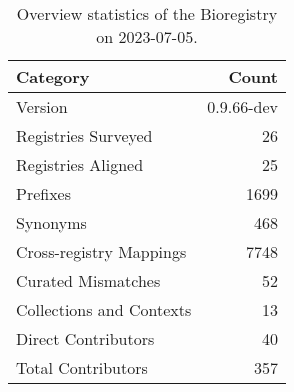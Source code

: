 \begin{table}
\caption{Overview statistics of the Bioregistry on 2023-07-05.}
\label{tab:bioregistry-summary}
\begin{tabular}{lr}
\toprule
Category & Count \\
\midrule
Version & 0.9.66-dev \\
Registries Surveyed & 26 \\
Registries Aligned & 25 \\
Prefixes & 1699 \\
Synonyms & 468 \\
Cross-registry Mappings & 7748 \\
Curated Mismatches & 52 \\
Collections and Contexts & 13 \\
Direct Contributors & 40 \\
Total Contributors & 357 \\
\bottomrule
\end{tabular}
\end{table}
